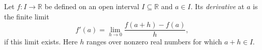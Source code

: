 
Let $f:I\to\mathbb R$ be defined on an open interval $I\subseteq\mathbb R$ and $a\in I$. Its \emph{derivative} at $a$ is the finite limit
\[
f'(a)=\lim_{h\to0}\frac{f(a+h)-f(a)}{h},
\]
if this limit exists. Here $h$ ranges over nonzero real numbers for which $a+h\in I$.
